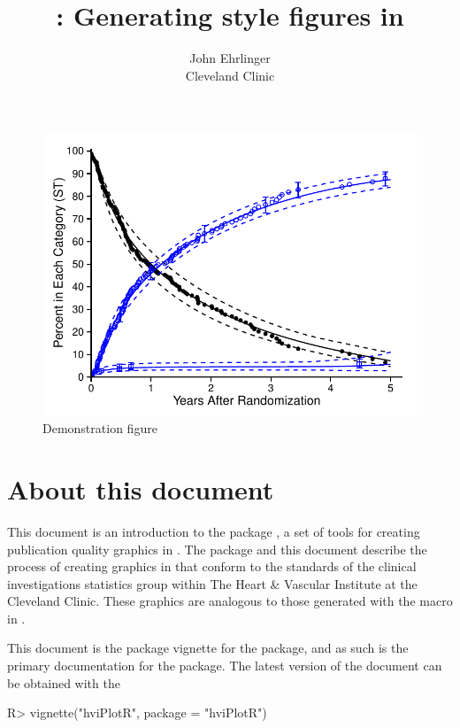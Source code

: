 \documentclass[nojss]{jss}\usepackage[]{graphicx}\usepackage[]{color}
\author{John Ehrlinger\\Cleveland Clinic} %
\title{{\pkg{hviPlotR}}: Generating \code{plot.sas} style figures in \proglang{R}}
\makeatletter
\def\maxwidth{ %
  \ifdim\Gin@nat@width>\linewidth
    \linewidth
  \else
    \Gin@nat@width
  \fi
}
\newenvironment{knitrout}{}{} %
\makeatother
\begin{document}

\begin{knitrout}\footnotesize
{}\color{fgcolor}\begin{figure}[!htpb]


{\centering \includegraphics[width=\maxwidth]{figure/beamer-introFigure} 

}

\caption[Demonstration figure]{Demonstration figure\label{F:introFigure}}
\end{figure}


\end{knitrout}
\section{About this document}
This document is an introduction to the  package , a set of tools for creating publication quality graphics in . The package and this document describe the process of creating graphics in  that conform to the standards of the clinical investigations statistics group within The Heart \& Vascular Institute at the Cleveland Clinic. These graphics are analogous to those generated with the  macro in .

This document is the package vignette for the  package, and as such is the primary documentation for the package. The latest version of the document can be obtained with the 
\begin{CodeChunk}
\begin{CodeInput}
R> vignette("hviPlotR", package = "hviPlotR")
\end{CodeInput}
\end{CodeChunk}
\end{document}
